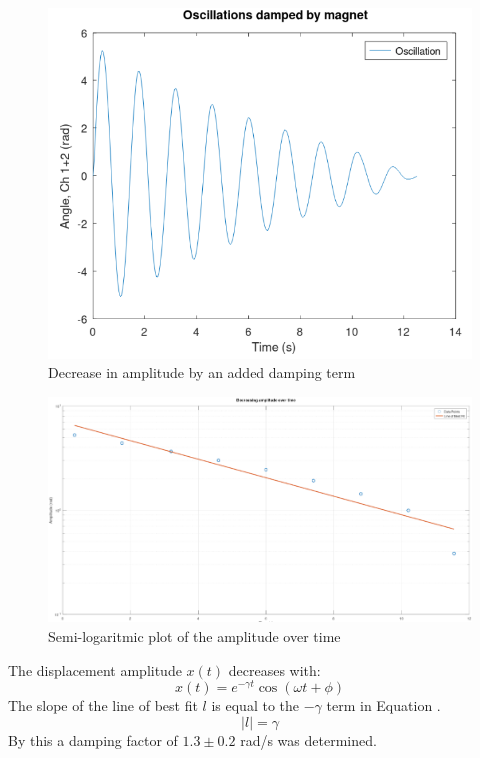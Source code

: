 \begin{figure}[h!]
  \centering
  \includegraphics[width=1\textwidth]{oscillations/images/underdamped}
  \caption{Decrease in amplitude by an added damping term}
  \label{fig:underdamped}
\end{figure}

\begin{figure}[h!]
  \centering
  \includegraphics[width=1\textwidth]{oscillations/images/log}
  \caption{Semi-logaritmic plot of the amplitude over time}
  \label{fig:log of damping factor}
\end{figure}

The displacement amplitude $x(t)$ decreases with:
\begin{equation}
  x(t) = e^{-\gamma t} \cos(\omega t + \phi) 
  \label{eq:displacement amplitude}
\end{equation}
The slope of the line of best fit $l$ is equal to the $-\gamma$ term in Equation .
\begin{equation}
  |l| = \gamma 
\end{equation}
By this a damping factor of $1.3 ± 0.2$ rad/s was determined.



